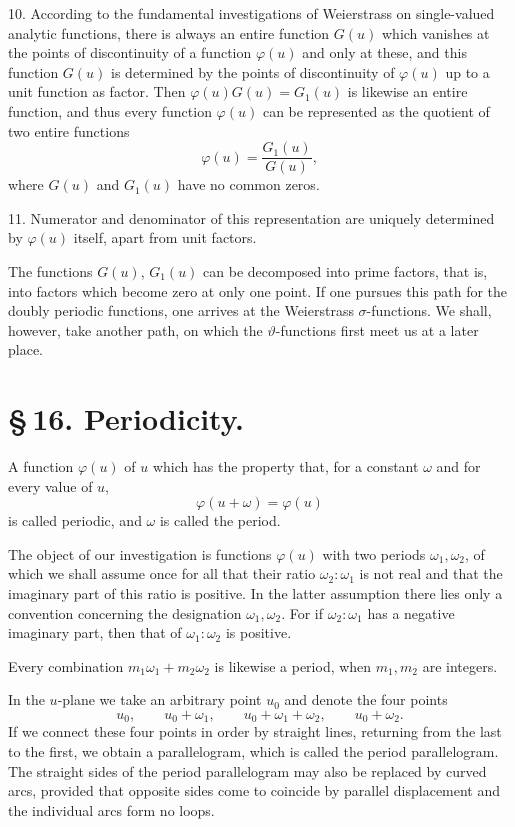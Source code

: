 \documentclass[11pt]{article}
\begin{document}
10. According to the fundamental investigations of Weierstrass on single-valued analytic functions, there is always an entire function $G(u)$ which vanishes at the points of discontinuity of a function $\varphi(u)$ and only at these, and this function $G(u)$ is determined by the points of discontinuity of $\varphi(u)$ up to a unit function as factor. Then $\varphi(u)G(u)=G_1(u)$ is likewise an entire function, and thus every function $\varphi(u)$ can be represented as the quotient of two entire functions
\[
\varphi(u)=\frac{G_1(u)}{G(u)},
\]
where $G(u)$ and $G_1(u)$ have no common zeros.

11. Numerator and denominator of this representation are uniquely determined by $\varphi(u)$ itself, apart from unit factors.

The functions $G(u)$, $G_1(u)$ can be decomposed into prime factors, that is, into factors which become zero at only one point. If one pursues this path for the doubly periodic functions, one arrives at the Weierstrass $\sigma$-functions. We shall, however, take another path, on which the $\vartheta$-functions first meet us at a later place.

\section*{\S\,16. Periodicity.}

A function $\varphi(u)$ of $u$ which has the property that, for a constant $\omega$ and for every value of $u$,
\begin{equation}
\varphi(u+\omega)=\varphi(u)
\tag{1}
\end{equation}
is called periodic, and $\omega$ is called the period.

The object of our investigation is functions $\varphi(u)$ with two periods $\omega_1,\omega_2$, of which we shall assume once for all that their ratio $\omega_2:\omega_1$ is not real and that the imaginary part of this ratio is positive. In the latter assumption there lies only a convention concerning the designation $\omega_1,\omega_2$. For if $\omega_2:\omega_1$ has a negative imaginary part, then that of $\omega_1:\omega_2$ is positive.

Every combination $m_1\omega_1+m_2\omega_2$ is likewise a period, when $m_1,m_2$ are integers.

In the $u$-plane we take an arbitrary point $u_0$ and denote the four points
\[
u_0,\qquad u_0+\omega_1,\qquad u_0+\omega_1+\omega_2,\qquad u_0+\omega_2.
\]
If we connect these four points in order by straight lines, returning from the last to the first, we obtain a parallelogram, which is called the period parallelogram. The straight sides of the period parallelogram may also be replaced by curved arcs, provided that opposite sides come to coincide by parallel displacement and the individual arcs form no loops.
\end{document}
